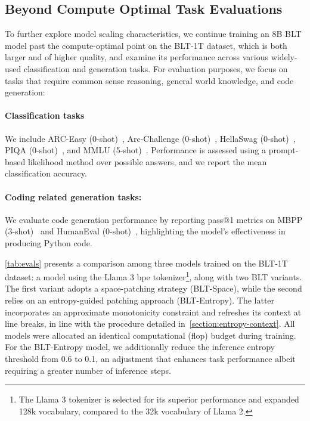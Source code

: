 \subsection{Beyond Compute Optimal Task Evaluations}
\label{section:evals}
To further explore model scaling characteristics, we continue training an 8B {\textsc BLT} model past the compute-optimal point on the {\textsc BLT}-1T dataset, which is both larger and of higher quality, and examine its performance across various widely-used classification and generation tasks. For evaluation purposes, we focus on tasks that require common sense reasoning, general world knowledge, and code generation:
\paragraph{Classification tasks} We include ARC-Easy (0-shot)~\citep{Eval_ARC}, Arc-Challenge (0-shot)~\citep{Eval_ARC}, HellaSwag (0-shot)~\citep{Eval_hellaswag}, PIQA (0-shot)~\citep{Eval_piqa}, and MMLU (5-shot)~\citep{hendrycks2020measuring}. Performance is assessed using a prompt-based likelihood method over possible answers, and we report the mean classification accuracy.
\paragraph{Coding related generation tasks:} We evaluate code generation performance by reporting pass@1 metrics on MBPP (3-shot)~\citep{Eval_MBPP} and HumanEval (0-shot)~\citep{Eval_HumanEval}, highlighting the model's effectiveness in producing Python code.

\autoref{tab:evals} presents a comparison among three models trained on the {\textsc BLT}-1T dataset: a model using the Llama 3 bpe tokenizer\footnote{The Llama 3 tokenizer is selected for its superior performance and expanded 128k vocabulary, compared to the 32k vocabulary of Llama 2.}, along with two {\textsc BLT} variants. The first variant adopts a space-patching strategy ({\textsc BLT}-Space), while the second relies on an entropy-guided patching approach ({\textsc BLT}-Entropy). The latter incorporates an approximate monotonicity constraint and refreshes its context at line breaks, in line with the procedure detailed in~\autoref{section:entropy-context}. All models were allocated an identical computational (flop) budget during training. For the {\textsc BLT}-Entropy model, we additionally reduce the inference entropy threshold from 0.6 to 0.1, an adjustment that enhances task performance albeit requiring a greater number of inference steps.

